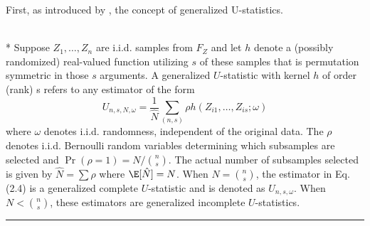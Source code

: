 First, as introduced by \citet{peng_rates_2022}, the concept of generalized U-statistics.
\begin{dfn}\label{Gen_UStat}\mbox{}\\*
	Suppose $Z_1, \ldots, Z_n$ are i.i.d. samples from $F_Z$ and let $h$ denote a (possibly randomized) real-valued function utilizing $s$ of these samples that is permutation symmetric in those $s$ arguments. A generalized $U$-statistic with kernel $h$ of order (rank) s refers to any estimator of the form
	\begin{equation}
		U_{n, s, N, \omega}=\frac{1}{\hat{N}} \sum_{(n, s)} \rho h\left(Z_{i 1}, \ldots, Z_{i s} ; \omega\right)
	\end{equation}
	where $\omega$ denotes i.i.d. randomness, independent of the original data.
	The $\rho$ denotes i.i.d. Bernoulli random variables determining which subsamples are selected and $\operatorname{Pr}(\rho=1)=N /\binom{n}{s}$.
	The actual number of subsamples selected is given by $\hat{N}=\sum \rho$ where $\E[\hat{N}]=N$.
	When $N=\binom{n}{s}$, the estimator in Eq. (2.4) is a generalized complete $U$-statistic and is denoted as $U_{n, s, \omega}$.
	When $N<\binom{n}{s}$, these estimators are generalized incomplete $U$-statistics.
\end{dfn}

\hrule

